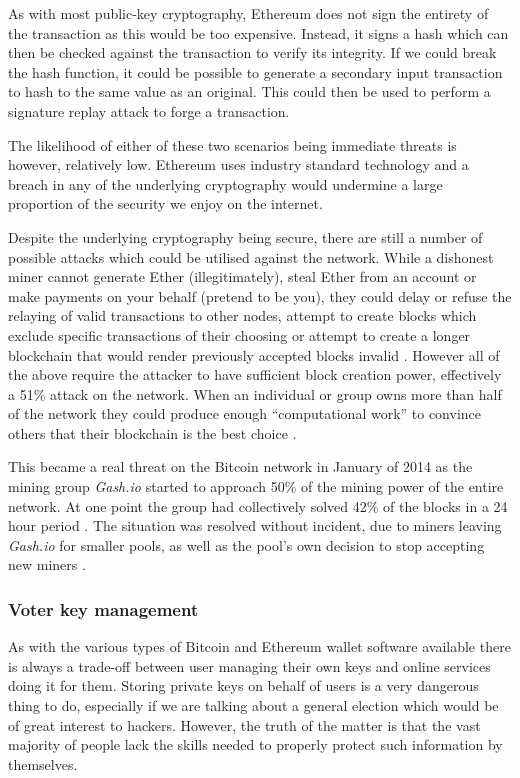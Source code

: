 \documentclass{article}
\begin{document}
As with most public-key cryptography, Ethereum does not sign the entirety of the transaction as this would be too expensive. Instead, it signs a hash which can then be checked against the transaction to verify its integrity. If we could break the hash function, it could be possible to generate a secondary input transaction to hash to the same value as an original. This could then be used to perform a signature replay attack to forge a transaction.

The likelihood of either of these two scenarios being immediate threats is however, relatively low. Ethereum uses industry standard technology and a breach in any of the underlying cryptography would undermine a large proportion of the security we enjoy on the internet. 

Despite the underlying cryptography being secure, there are still a number of possible attacks which could be utilised against the network. While a dishonest miner cannot generate Ether (illegitimately), steal Ether from an account or make payments on your behalf (pretend to be you), they could delay or refuse the relaying of valid transactions to other nodes, attempt to create blocks which exclude specific transactions of their choosing or attempt to create a longer blockchain that would render previously accepted blocks invalid \citep{22_brave_new_coin_2016}. However all of the above require the attacker to have sufficient block creation power, effectively a 51\% attack on the network. When an individual or group owns more than half of the network they could produce enough ``computational work'' to convince others that their blockchain is the best choice \citep{41_yang_2011}.

This became a real threat on the Bitcoin network in January of 2014 as the mining group \textit{Gash.io} started to approach 50\% of the mining power of the entire network. At one point the group had collectively solved 42\% of the blocks in a 24 hour period \citep{42_liu_2014}. The situation was resolved without incident, due to miners leaving \textit{Gash.io} for smaller pools, as well as the pool’s own decision to stop accepting new miners \citep{41_yang_2011}.
	
	\subsubsection{Voter key management}
	As with the various types of Bitcoin and Ethereum wallet software available there is always a trade-off between user managing their own keys and online services doing it for them. Storing private keys on behalf of users is a very dangerous thing to do, especially if we are talking about a general election which would be of great interest to hackers. However, the truth of the matter is that the vast majority of people lack the skills needed to properly protect such information by themselves.
	
\end{document}
